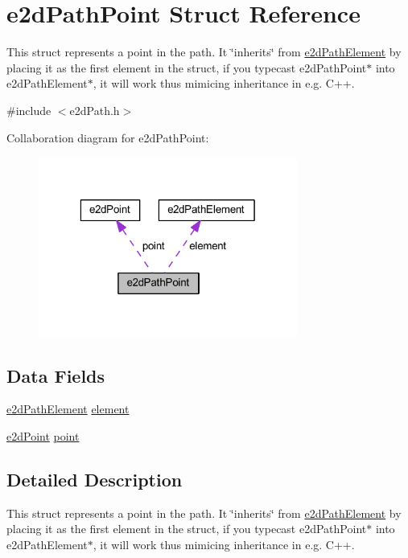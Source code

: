 \hypertarget{structe2dPathPoint}{\section{e2d\-Path\-Point Struct Reference}
\label{structe2dPathPoint}
}


This struct represents a point in the path. It \char`\"{}inherits\char`\"{} from \hyperlink{structe2dPathElement}{e2d\-Path\-Element} by placing it as the first element in the struct, if you typecast e2d\-Path\-Point$\ast$ into e2d\-Path\-Element$\ast$, it will work thus mimicing inheritance in e.\-g. C++.  




{\ttfamily \#include $<$e2d\-Path.\-h$>$}



Collaboration diagram for e2d\-Path\-Point\-:\nopagebreak
\begin{figure}[H]
\begin{center}
\leavevmode
\includegraphics[width=241pt]{structe2dPathPoint__coll__graph}
\end{center}
\end{figure}
\subsection*{Data Fields}
\begin{DoxyCompactItemize}
\item 
\hyperlink{structe2dPathElement}{e2d\-Path\-Element} \hyperlink{structe2dPathPoint_a88e514266530010a1a3b08198b3cc763}{element}
\item 
\hyperlink{structe2dPoint}{e2d\-Point} \hyperlink{structe2dPathPoint_afff60c971a4d4728af80b4753d30c5bf}{point}
\end{DoxyCompactItemize}


\subsection{Detailed Description}
This struct represents a point in the path. It \char`\"{}inherits\char`\"{} from \hyperlink{structe2dPathElement}{e2d\-Path\-Element} by placing it as the first element in the struct, if you typecast e2d\-Path\-Point$\ast$ into e2d\-Path\-Element$\ast$, it will work thus mimicing inheritance in e.\-g. C++. 

